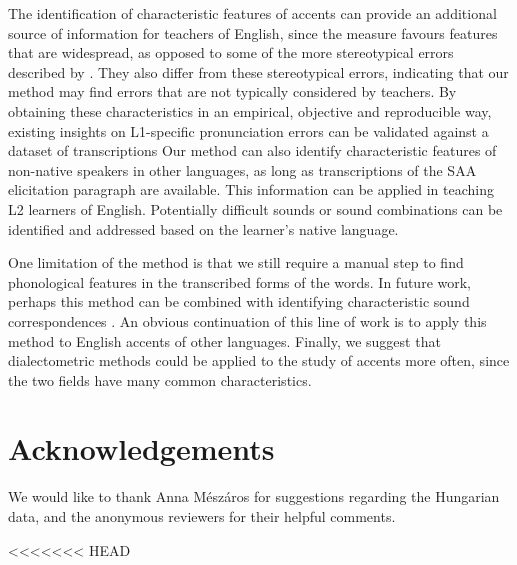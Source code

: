 \documentclass[output=paper]{LSP/langsci}
\begin{document}
The identification of characteristic features of accents can provide an additional source of information for teachers of English, since the measure favours features that are widespread, as opposed to some of the more stereotypical errors described by \citet{van_den_doel_evaluation_2006}. They also differ from these stereotypical errors, indicating that our method may find errors that are not typically considered by teachers. By obtaining these characteristics in an empirical, objective and reproducible way, existing insights on L1-specific pronunciation errors can be validated against a dataset of transcriptions Our method can also identify characteristic features of non-native speakers in other languages, as long as transcriptions of the SAA elicitation paragraph are available. This information can be applied in teaching L2 learners of English. Potentially difficult sounds or sound combinations can be identified and addressed based on the learner's native language.

One limitation of the method is that we still require a manual step to find phonological features in the transcribed forms of the words. In future work, perhaps this method can be combined with identifying characteristic sound correspondences \citep{wieling_bipartite_2011}. An obvious continuation of this line of work is to apply this method to English accents of other languages. Finally, we suggest that dialectometric methods could be applied to the study of accents more often, since the two fields have many common characteristics.

\section*{Acknowledgements}

We would like to thank Anna M\'{e}sz\'{a}ros for suggestions regarding the Hungarian data, and the anonymous reviewers for their helpful comments.


\printbibliography[heading=subbibliography,notkeyword=this]
<<<<<<< HEAD
\end{document}
